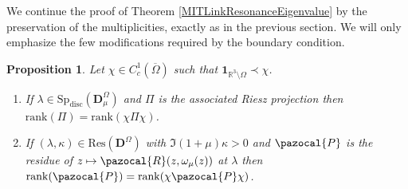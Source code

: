 \documentclass[a4paper, 12pt]{amsart}
\numberwithin{equation}{section}
\newtheorem{proposition}{Proposition}[section]
\newcommand{\R}{\mathbb{R}} %
\newcommand{\rank}{\mathrm{rank}} %
\newcommand{\Sp}{\mathrm{Sp}} %
\newcommand{\disc}{\mathrm{disc}} %
\newcommand{\Res}{\mathrm{Res}} %
\newcommand{\indic}{\mathbf{1}} %
\newcommand{\Dvec}{\mathbf{D}}
\newcommand{\Ppaz}{\pazocal{P}}
\newcommand{\Rpaz}{\pazocal{R}}
\begin{document}
We continue the proof of Theorem \ref{MITLinkResonanceEigenvalue} by the preservation of the multiplicities, exactly as in the previous section. We will only emphasize the few modifications required by the boundary condition. 

\begin{proposition}\label{MITTruncatedRanks}
    Let $\chi\in C^1_c(\overline{\Omega})$ such that $\indic_{\R^3\setminus\Omega}\prec\chi$. 
    \begin{enumerate}
        \item If $\lambda\in\Sp_\disc(\Dvec^\Omega_\mu)$ and $\Pi$ is the associated Riesz projection then $\rank(\Pi)=\rank(\chi\Pi\chi)$.
        \item If $(\lambda,\kappa)\in\Res(\Dvec^\Omega)$ with $\Im(1+\mu)\kappa>0$ and $\Ppaz$ is the residue of $z\mapsto\Rpaz(z,\omega_\mu(z))$ at $\lambda$ then $\rank(\Ppaz)=\rank(\chi\Ppaz\chi)$.
    \end{enumerate}
\end{proposition}
\end{document}
